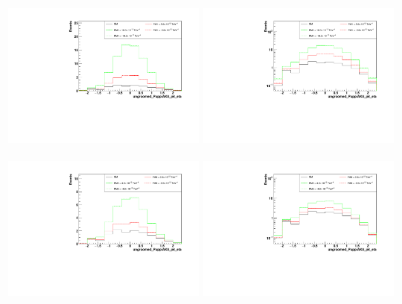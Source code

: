 \begin{figure}[h]
  \begin{center}
	\includegraphics[width=0.45\textwidth]{Plots/aQGC_kinematics/ungroomed_PuppiAK8_jet_eta_FM1.pdf}%
	\includegraphics[width=0.45\textwidth]{Plots/aQGC_kinematics/ungroomed_PuppiAK8_jet_eta_FM1_log.pdf}\\		
    \caption{}
  \end{center}
\end{figure}
\begin{figure}[h]
  \begin{center}
	\includegraphics[width=0.45\textwidth]{Plots/aQGC_kinematics/ungroomed_PuppiAK8_jet_eta_FM6.pdf}%
	\includegraphics[width=0.45\textwidth]{Plots/aQGC_kinematics/ungroomed_PuppiAK8_jet_eta_FM6_log.pdf}\\		
    \caption{}
  \end{center}
\end{figure}
